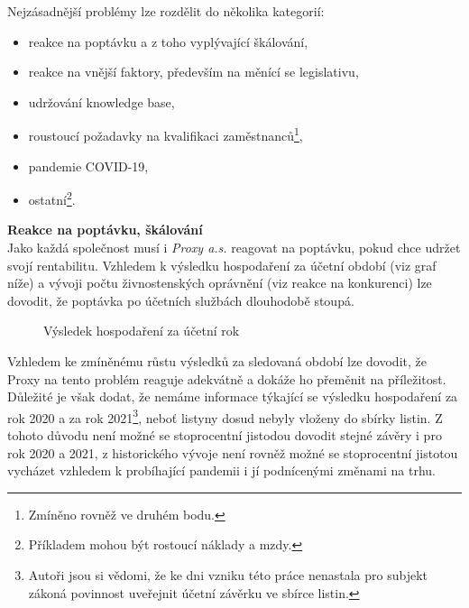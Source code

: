 Nejzásadnější problémy lze rozdělit do několika kategorií:\\

\begin{itemize}
	\item reakce na poptávku a z toho vyplývající škálování,
	\item reakce na vnější faktory, především na měnící se legislativu,
	\item udržování knowledge base,
	\item roustoucí požadavky na kvalifikaci zaměstnanců\footnote{Zmíněno rovněž ve druhém bodu.},
	\item pandemie COVID-19,
	\item ostatní\footnote{Příkladem mohou být rostoucí náklady a mzdy.}.
\end{itemize}

\vspace*{5mm}

\newpage

\textbf{Reakce na poptávku, škálování}\\

Jako každá společnost musí i \textit{Proxy a.s.} reagovat na poptávku, pokud chce udržet svojí rentabilitu. Vzhledem k výsledku hospodaření za účetní období (viz graf níže) a vývoji počtu živnostenských oprávnění (viz reakce na konkurenci) lze dovodit, že poptávka po účetních službách dlouhodobě stoupá.

\begin{figure}[!htbp]
	\caption[Výsledek hospodaření za účetní rok]{Výsledek hospodaření za účetní rok}
	\label{fig:Vysledek hospodareni}
\end{figure}

Vzhledem ke zmíněnému růstu výsledků za sledovaná období lze dovodit, že Proxy na tento problém reaguje adekvátně a dokáže ho přeměnit na příležitost.\\

Důležité je však dodat, že nemáme informace týkající se výsledku hospodaření za rok 2020 a za rok 2021\footnote{Autoři jsou si vědomi, že ke dni vzniku této práce nenastala pro subjekt zákoná povinnost uveřejnit účetní závěrku ve sbírce listin.}, neboť listyny dosud nebyly vloženy do sbírky listin. Z tohoto důvodu není možné se stoprocentní jistodou dovodit stejné závěry i pro rok 2020 a 2021, z historického vývoje není rovněž možné se stoprocentní jistotou vycházet vzhledem k probíhající pandemii i jí podnícenými změnami na trhu.\\

